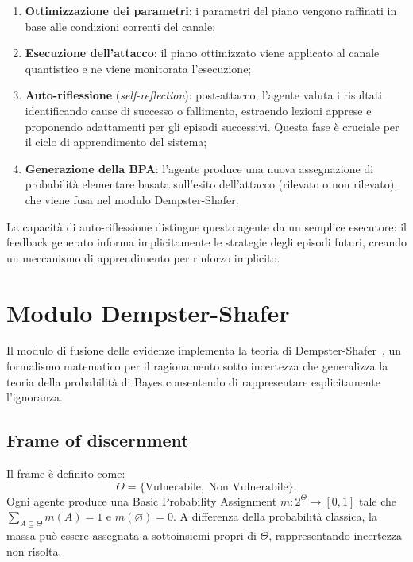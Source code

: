 \begin{enumerate}
    \item \textbf{Ottimizzazione dei parametri}: i parametri del piano vengono raffinati in base alle condizioni correnti del canale;
    
    \item \textbf{Esecuzione dell'attacco}: il piano ottimizzato viene applicato al canale quantistico e ne viene monitorata l'esecuzione;
    
    \item \textbf{Auto-riflessione} (\emph{self-reflection}): post-attacco, l'agente valuta i risultati identificando cause di successo o fallimento, estraendo lezioni apprese e proponendo adattamenti per gli episodi successivi. Questa fase è cruciale per il ciclo di apprendimento del sistema;
    
    \item \textbf{Generazione della BPA}: l'agente produce una nuova assegnazione di probabilità elementare basata sull'esito dell'attacco (rilevato o non rilevato), che viene fusa nel modulo Dempster-Shafer.
\end{enumerate}

La capacità di auto-riflessione distingue questo agente da un semplice esecutore: il feedback generato informa implicitamente le strategie degli episodi futuri, creando un meccanismo di apprendimento per rinforzo implicito.

\section{Modulo Dempster-Shafer}
\label{sec:dempster-shafer}

Il modulo di fusione delle evidenze implementa la teoria di Dempster-Shafer~\cite{shafer1976mathematical,dempster1968upper}, un formalismo matematico per il ragionamento sotto incertezza che generalizza la teoria della probabilità di Bayes consentendo di rappresentare esplicitamente l'ignoranza.

\subsection{Frame of discernment}
Il frame è definito come:
\[
    \Theta = \{\text{Vulnerabile},\ \text{Non Vulnerabile}\}.
\]
Ogni agente produce una Basic Probability Assignment $m: 2^\Theta \to [0,1]$ tale che $\sum_{A \subseteq \Theta} m(A) = 1$ e $m(\varnothing) = 0$. A differenza della probabilità classica, la massa può essere assegnata a sottoinsiemi propri di $\Theta$, rappresentando incertezza non risolta.

